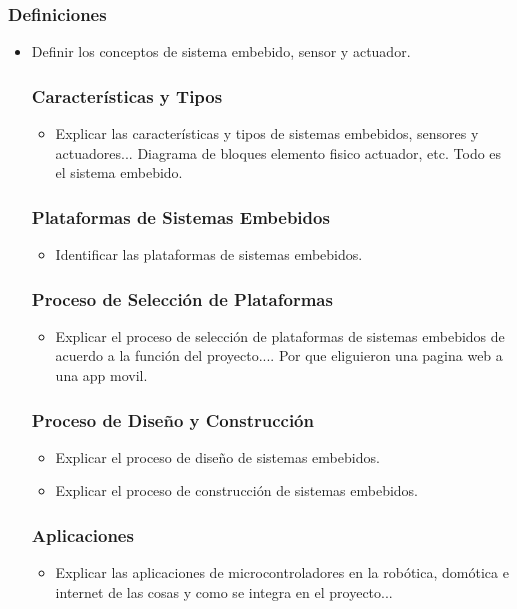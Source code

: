 \documentclass[a4paper,12pt]{article}
\begin{document}
	\subsubsection{Definiciones}
	\begin{itemize}
		\item Definir los conceptos de sistema embebido, sensor y actuador.
		
		\subsubsection{Características y Tipos}
		\begin{itemize}
			\item Explicar las características y tipos de sistemas embebidos, sensores y actuadores... Diagrama de bloques elemento fisico actuador, etc. Todo es el sistema embebido.
		\end{itemize}
		\subsubsection{Plataformas de Sistemas Embebidos}
		\begin{itemize}
			\item Identificar las plataformas de sistemas embebidos.
		\end{itemize}
		\subsubsection{Proceso de Selección de Plataformas}
		\begin{itemize}
			\item Explicar el proceso de selección de plataformas de sistemas embebidos de acuerdo a la función del proyecto.... Por que eliguieron una pagina web a una app movil.
		\end{itemize}
		\subsubsection{Proceso de Diseño y Construcción}
		\begin{itemize}
			\item Explicar el proceso de diseño de sistemas embebidos.
			\item Explicar el proceso de construcción de sistemas embebidos.
		\end{itemize}
		\subsubsection{Aplicaciones}
		\begin{itemize}
			\item Explicar las aplicaciones de microcontroladores en la robótica, domótica e internet de las cosas y como se integra en el proyecto... 
		\end{itemize}
	\end{itemize}
	
\end{document}
